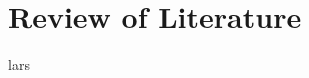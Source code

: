 \section{Review of Literature}\label{sec:lit_review}

lars \cite{center_for_history_and_new_media_hurtig_nodate}